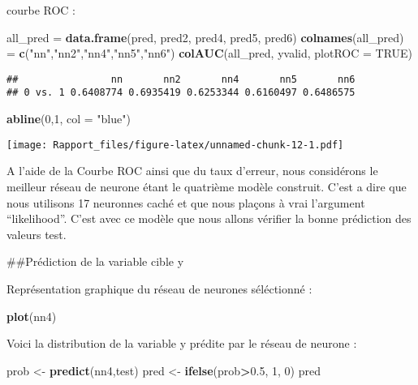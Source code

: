 \documentclass[
]{article}
\newenvironment{Shaded}{\begin{snugshade}}{\end{snugshade}}
\newcommand{\DataTypeTok}[1]{\textcolor[rgb]{0.13,0.29,0.53}{#1}}
\newcommand{\DecValTok}[1]{\textcolor[rgb]{0.00,0.00,0.81}{#1}}
\newcommand{\FloatTok}[1]{\textcolor[rgb]{0.00,0.00,0.81}{#1}}
\newcommand{\KeywordTok}[1]{\textcolor[rgb]{0.13,0.29,0.53}{\textbf{#1}}}
\newcommand{\NormalTok}[1]{#1}
\newcommand{\OperatorTok}[1]{\textcolor[rgb]{0.81,0.36,0.00}{\textbf{#1}}}
\newcommand{\OtherTok}[1]{\textcolor[rgb]{0.56,0.35,0.01}{#1}}
\newcommand{\StringTok}[1]{\textcolor[rgb]{0.31,0.60,0.02}{#1}}
\begin{document}
courbe ROC :

\begin{Shaded}
\begin{Highlighting}[]
\NormalTok{all_pred =}\StringTok{ }\KeywordTok{data.frame}\NormalTok{(pred, pred2,  pred4, pred5, pred6)}
\KeywordTok{colnames}\NormalTok{(all_pred) =}\StringTok{ }\KeywordTok{c}\NormalTok{(}\StringTok{"nn"}\NormalTok{,}\StringTok{"nn2"}\NormalTok{,}\StringTok{"nn4"}\NormalTok{,}\StringTok{"nn5"}\NormalTok{,}\StringTok{"nn6"}\NormalTok{)}
\KeywordTok{colAUC}\NormalTok{(all_pred, yvalid, }\DataTypeTok{plotROC =} \OtherTok{TRUE}\NormalTok{)}
\end{Highlighting}
\end{Shaded}

\begin{verbatim}
##                nn       nn2       nn4       nn5       nn6
## 0 vs. 1 0.6408774 0.6935419 0.6253344 0.6160497 0.6486575
\end{verbatim}

\begin{Shaded}
\begin{Highlighting}[]
\KeywordTok{abline}\NormalTok{(}\DecValTok{0}\NormalTok{,}\DecValTok{1}\NormalTok{, }\DataTypeTok{col =} \StringTok{"blue"}\NormalTok{)}
\end{Highlighting}
\end{Shaded}

\texttt{[image: Rapport\_files/figure-latex/unnamed-chunk-12-1.pdf]}

A l'aide de la Courbe ROC ainsi que du taux d'erreur, nous considérons
le meilleur réseau de neurone étant le quatrième modèle construit. C'est
a dire que nous utilisons 17 neuronnes caché et que nous plaçons à vrai
l'argument ``likelihood''. C'est avec ce modèle que nous allons vérifier
la bonne prédiction des valeurs test.

\#\#Prédiction de la variable cible y

Représentation graphique du réseau de neurones séléctionné :

\begin{Shaded}
\begin{Highlighting}[]
\KeywordTok{plot}\NormalTok{(nn4)}
\end{Highlighting}
\end{Shaded}

Voici la distribution de la variable y prédite par le réseau de neurone
:

\begin{Shaded}
\begin{Highlighting}[]
\NormalTok{prob <-}\StringTok{ }\KeywordTok{predict}\NormalTok{(nn4,test)}
\NormalTok{pred <-}\StringTok{ }\KeywordTok{ifelse}\NormalTok{(prob}\OperatorTok{>}\FloatTok{0.5}\NormalTok{, }\DecValTok{1}\NormalTok{, }\DecValTok{0}\NormalTok{)}
\NormalTok{pred}
\end{Highlighting}
\end{Shaded}
\end{document}
